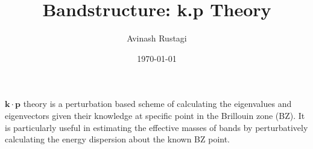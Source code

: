 \documentclass[aps,prb,onecolumn,notitlepage,showpacs,floatfix,superscriptaddress]{revtex4-1}
\newcommand{\bk}{{\bm k}}
\newcommand{\bp}{{\bm p}}
\begin{document}
\title{Bandstructure: k.p Theory}

\author{Avinash Rustagi}
%
\date{\today}

\maketitle

$\bk \cdot \bp$ theory is a perturbation based scheme of calculating the eigenvalues and eigenvectors given their knowledge at specific point in the Brillouin zone (BZ). It is particularly useful in estimating the effective masses of bands by perturbatively calculating the energy dispersion about the known BZ point.\\
\end{document}
